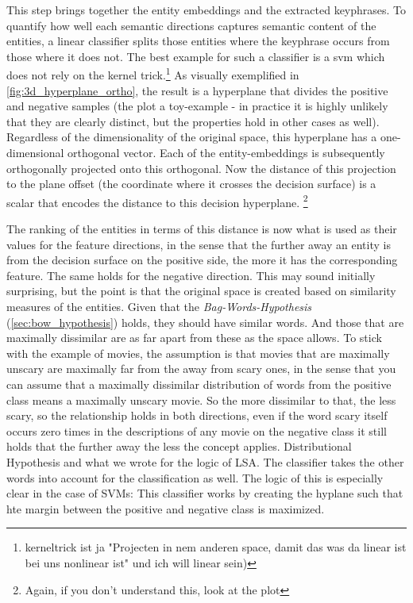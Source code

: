 This step brings together the entity embeddings and the extracted keyphrases. To quantify how well each semantic directions captures semantic content of the entities, a linear classifier splits those entities where the keyphrase occurs from those where it does not. The best example for such a classifier is a \gls{svm} which does not rely on the kernel trick.\footnote{kerneltrick ist ja "Projecten in nem anderen space, damit das was da linear ist bei uns nonlinear ist" und ich will linear sein)} As visually exemplified in \autoref{fig:3d_hyperplane_ortho}, the result is a hyperplane that divides the positive and negative samples (the plot a toy-example - in practice it is highly unlikely that they are clearly distinct, but the properties hold in other cases as well). Regardless of the dimensionality of the original space, this hyperplane has a one-dimensional orthogonal vector. Each of the entity-embeddings is subsequently orthogonally projected onto this orthogonal. Now the distance of this projection to the plane offset (the coordinate where it crosses the decision surface) is a scalar that encodes the distance to this decision hyperplane. \footnote{Again, if you don't understand this, look at the plot}

The ranking of the entities in terms of this distance is now what is used as their values for the feature directions, in the sense that the further away an entity is from the decision surface on the positive side, the more it has the corresponding feature. The same holds for the negative direction. This may sound initially surprising, but the point is that the original space is created based on similarity measures of the entities. Given that the \textit{Bag-Words-Hypothesis} (\autoref{sec:bow_hypothesis}) holds, they should have similar words. And those that are maximally dissimilar are as far apart from these as the space allows. To stick with the example of movies, the assumption is that movies that are maximally unscary are maximally far from the away from scary ones, in the sense that you can assume that a maximally dissimilar distribution of words from the positive class means a maximally unscary movie. So the more dissimilar to that, the less scary, so the relationship holds in both directions, even if the word scary itself occurs zero times in the descriptions of any movie on the negative class it still holds that the further away the less the concept applies. Distributional Hypothesis and what we wrote for the logic of LSA. The classifier takes the other words into account for the classification as well. The logic of this is especially clear in the case of SVMs: This classifier works by creating the hyplane such that hte margin between the positive and negative class is maximized. 

